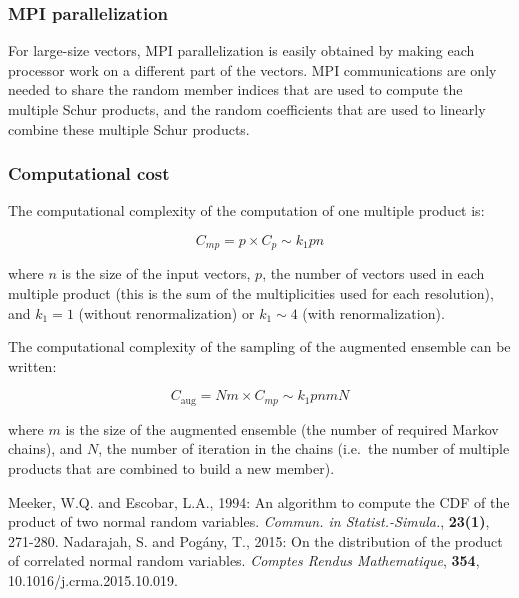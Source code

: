 \documentclass[11pt]{article}
\begin{document}
\subsubsection*{MPI parallelization}

For large-size vectors,
MPI parallelization is easily obtained by making each processor
work on a different part of the vectors.
MPI communications are only needed to share
the random member indices that are used to compute the multiple Schur products,
and the random coefficients that are used to linearly combine these multiple Schur products.

\subsubsection*{Computational cost}

The computational complexity of the computation of one multiple product is:

\begin{equation}
C_{mp} = p \times C_p \sim k_1 p n
\end{equation}

\noindent
where $n$ is the size of the input vectors,
$p$, the number of vectors used in each multiple product
(this is the sum of the multiplicities used for each resolution),
and $k_1=1$ (without renormalization) or $k_1\sim 4$ (with renormalization).

The computational complexity of the sampling of the augmented ensemble can be written:

\begin{equation}
C_{\mbox{aug}} = N m \times C_{mp} \sim k_1 p n m N
\end{equation}

\noindent
where $m$ is the size of the augmented ensemble (the number of required Markov chains), and
$N$, the number of iteration in the chains (i.e.\ the number of multiple products
that are combined to build a new member).

\begin{thebibliography}{}
Meeker, W.Q. and Escobar, L.A., 1994:
An algorithm to compute the CDF of the product of two normal random variables.
\textit{Commun. in Statist.-Simula.}, \textbf{23(1)}, 271-280.
Nadarajah, S. and Pog\'any, T., 2015:
On the distribution of the product of correlated normal random variables.
\textit{Comptes Rendus Mathematique}, \textbf{354}, 10.1016/j.crma.2015.10.019.
\end{thebibliography}
\end{document}
